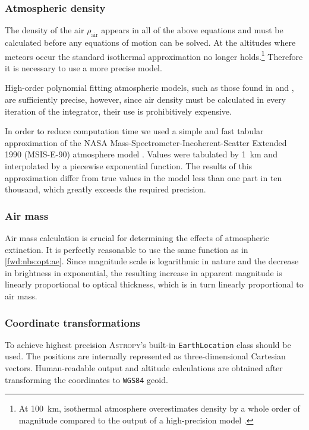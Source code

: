         \subsubsection{Atmospheric density}
            The density of the air $\rho_{\mathrm{air}}$ appears in all of the above equations
            and must be calculated before any equations of motion can be solved.
            At the altitudes where meteors occur the standard isothermal approximation no longer holds.\footnote{At \SI{100}{\kilo\metre},
            isothermal atmosphere overestimates density by a whole order of magnitude compared to the output of
            a high-precision model \cite{msise90}.} Therefore it is necessary to use a more precise model.
            
            High-order polynomial fitting atmospheric models, such as those found in \cite{braeunig2014} and \cite{ussa1976}, are sufficiently precise,
            however, since air density must be calculated in every iteration of the integrator, their use is prohibitively expensive.

            In order to reduce computation time we used a simple and fast tabular approximation of the
            NASA Mass-Spectrometer-Incoherent-Scatter Extended 1990 (MSIS-E-90) atmosphere model \cite{msise90}.
            Values were tabulated by \SI{1}{\kilo\metre} and interpolated by a piecewise exponential function.
            The results of this approximation differ from true values in the model less than one part in ten thousand,
            which greatly exceeds the required precision.

        \subsubsection{Air mass} \label{sim:pmf:sq:am}
            Air mass calculation is crucial for determining the effects of atmospheric extinction.
            It is perfectly reasonable to use the same function as in \ref{fwd:nbs:opt:ae}.
            Since magnitude scale is logarithmic in nature and the decrease in brightness in exponential,
            the resulting increase in apparent magnitude is linearly proportional to optical thickness, which is in turn
            linearly proportional to air mass.

        \subsubsection{Coordinate transformations} \label{sim:pmf:sq:ct}
            To achieve highest precision \textsc{Astropy}'s built-in \texttt{EarthLocation} class should be used.
            The positions are internally represented as three-dimensional Cartesian vectors. Human-readable output
            and altitude calculations are obtained after transforming the coordinates to \texttt{WGS84} geoid.

